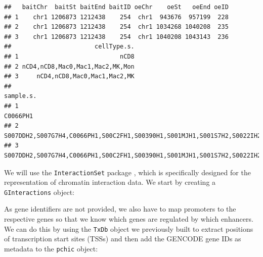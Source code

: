 \documentclass[9pt,a4paper,]{extarticle}
\newenvironment{Shaded}{\begin{snugshade}}{\end{snugshade}}
\newcommand{\KeywordTok}[1]{\textcolor[rgb]{0.13,0.29,0.53}{\textbf{#1}}}
\newcommand{\DataTypeTok}[1]{\textcolor[rgb]{0.13,0.29,0.53}{#1}}
\newcommand{\StringTok}[1]{\textcolor[rgb]{0.31,0.60,0.02}{#1}}
\newcommand{\OperatorTok}[1]{\textcolor[rgb]{0.81,0.36,0.00}{\textbf{#1}}}
\newcommand{\NormalTok}[1]{#1}
\theoremstyle{definition}
\theoremstyle{definition}
\theoremstyle{definition}
\theoremstyle{remark}
\begin{document}
\begin{verbatim}
##   baitChr  baitSt baitEnd baitID oeChr    oeSt   oeEnd oeID
## 1    chr1 1206873 1212438    254  chr1  943676  957199  228
## 2    chr1 1206873 1212438    254  chr1 1034268 1040208  235
## 3    chr1 1206873 1212438    254  chr1 1040208 1043143  236
##                       cellType.s.
## 1                            nCD8
## 2 nCD4,nCD8,Mac0,Mac1,Mac2,MK,Mon
## 3     nCD4,nCD8,Mac0,Mac1,Mac2,MK
##                                                                                                     sample.s.
## 1                                                                                                    C0066PH1
## 2 S007DDH2,S007G7H4,C0066PH1,S00C2FH1,S00390H1,S001MJH1,S001S7H2,S0022IH2,S00622H1,S00BS4H1,S004BTH2,C000S5H2
## 3          S007DDH2,S007G7H4,C0066PH1,S00C2FH1,S00390H1,S001MJH1,S001S7H2,S0022IH2,S00622H1,S00BS4H1,S004BTH2
\end{verbatim}

We will use the \texttt{InteractionSet} package \citep{Lun2016}, which is specifically designed for the representation of chromatin interaction data.
We start by creating a \texttt{GInteractions} object:

\begin{Shaded}
\end{Shaded}

As gene identifiers are not provided, we also have to map promoters to the respective genes so that we know which genes are regulated by which enhancers.
We can do this by using the \texttt{TxDb} object we previously built to extract positions of transcription start sites (TSSs) and then add the GENCODE gene IDs as metadata to the \texttt{pchic} object:
\end{document}

